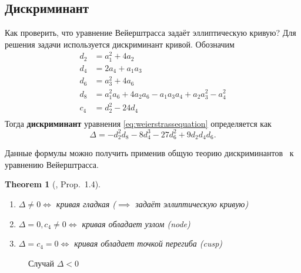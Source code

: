 \documentclass[11pt]{exam}
\newtheorem{theorem}{Theorem}[section]
\theoremstyle{definition}
\begin{document}
{\subsection{Дискриминант}
Как проверить, что уравнение Вейерштрасса задаёт эллиптическую кривую? Для решения задачи используется дискриминант кривой. Обозначим
\begin{equation}
	\begin{split}
		d_2 &= a_1^2 + 4a_2 \\
		d_4 &= 2a_4 + a_1a_3 \\
		d_6 &= a_3^2 + 4a_6 \\
		d_8 &= a_1^2a_6 + 4a_2a_6 - a_1a_3a_4 + a_2a_3^2 - a_4^2 \\
		c_4 &= d_2^2 - 24d_4 \\
	\end{split}
\end{equation}
Тогда \textbf{дискриминант} уравнения \eqref{eq:weierstrassequation} определяется как 
\[
\Delta = -d_2^2d_8 - 8d_4^3-27d_6^2+9d_2d_4d_6.
\]

Данные формулы можно получить применив общую теорию дискриминантов~\cite[Ch.~13]{GelfandKapranovZelevinsky1994} к уравнению Вейерштрасса. 

\begin{theorem}[\cite{Silverman2009}, Prop.~1.4]
~
\begin{enumerate}
	\item $\Delta \neq 0 \iff$ кривая гладкая ($\implies$ задаёт эллиптическую кривую) 
	\item $\Delta = 0, c_4 \neq 0 \iff$ кривая обладает узлом (node) 
	\item $\Delta = c_4 = 0 \iff$ кривая обладает точкой перегиба (cusp)
\end{enumerate}
\end{theorem}

	\begin{figure}[h!]
		\caption{Случай $\Delta < 0$}
	\end{figure}

}
\end{document}
